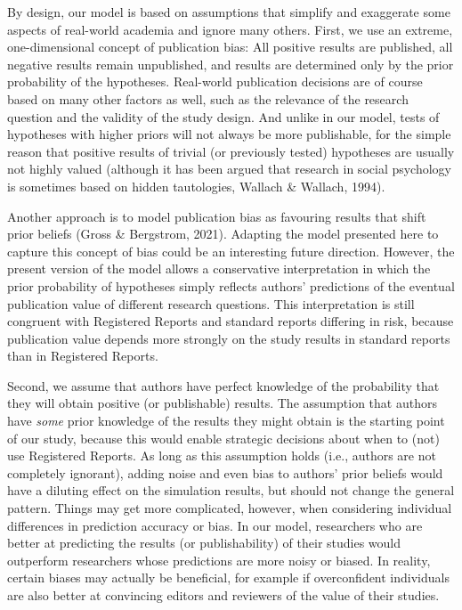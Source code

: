\documentclass[
  ,man,mask,floatsintext]{apa6}
\begin{document}
By design, our model is based on assumptions that simplify and exaggerate some aspects of real-world academia and ignore many others.
First, we use an extreme, one-dimensional concept of publication bias:
All positive results are published, all negative results remain unpublished, and results are determined only by the prior probability of the hypotheses.
Real-world publication decisions are of course based on many other factors as well, such as the relevance of the research question and the validity of the study design.
And unlike in our model, tests of hypotheses with higher priors will not always be more publishable, for the simple reason that positive results of trivial (or previously tested) hypotheses are usually not highly valued (although it has been argued that
research in social psychology is sometimes based on hidden tautologies, Wallach \& Wallach, 1994).

Another approach is to model publication bias as favouring results that shift prior beliefs (Gross \& Bergstrom, 2021).
Adapting the model presented here to capture this concept of bias could be an interesting future direction.
However, the present version of the model allows a conservative interpretation in which the prior probability of hypotheses simply reflects authors' predictions of the eventual publication value of different research questions.
This interpretation is still congruent with Registered Reports and standard reports differing in risk, because publication value depends more strongly on the study results in standard reports than in Registered Reports.

Second, we assume that authors have perfect knowledge of the probability that they will obtain positive (or publishable) results.
The assumption that authors have \emph{some} prior knowledge of the results they might obtain is the starting point of our study, because this would enable strategic decisions about when to (not) use Registered Reports.
As long as this assumption holds (i.e., authors are not completely ignorant), adding noise and even bias to authors' prior beliefs would have a diluting effect on the simulation results, but should not change the general pattern.
Things may get more complicated, however, when considering individual differences in
prediction accuracy or bias.
In our model, researchers who are better at predicting the results (or publishability) of their studies would outperform researchers whose predictions are more noisy or biased.
In reality, certain biases may actually be beneficial, for example if overconfident individuals are also better at convincing editors and reviewers of the value of their studies.
\end{document}
